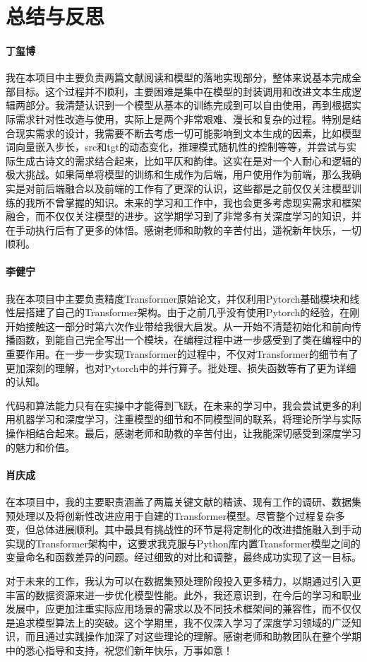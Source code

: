 \section{总结与反思}\label{sec-8}

\paragraph{丁玺博} 我在本项目中主要负责两篇文献阅读和模型的落地实现部分，整体来说基本完成全部目标。这个过程并不顺利，主要困难是集中在模型的封装调用和改进文本生成逻辑两部分。我清楚认识到一个模型从基本的训练完成到可以自由使用，再到根据实际需求针对性改造与使用，实际上是两个非常艰难、漫长和复杂的过程。特别是结合现实需求的设计，我需要不断去考虑一切可能影响到文本生成的因素，比如模型词向量嵌入步长，src和tgt的动态变化，推理模式随机性的控制等等，并尝试与实际生成古诗文的需求结合起来，比如平仄和韵律。这实在是对一个人耐心和逻辑的极大挑战。如果简单将模型的训练和生成作为后端，用户使用作为前端，那么我确实是对前后端融合以及前端的工作有了更深的认识，这些都是之前仅仅关注模型训练的我所不曾掌握的知识。未来的学习和工作中，我也会更多考虑现实需求和框架融合，而不仅仅关注模型的进步。这学期学习到了非常多有关深度学习的知识，并在手动执行后有了更多的体悟。感谢老师和助教的辛苦付出，遥祝新年快乐，一切顺利。

\paragraph{李健宁} 我在本项目中主要负责精度Transformer原始论文，并仅利用Pytorch基础模块和线性层搭建了自己的Transformer架构。由于之前几乎没有使用Pytorch的经验，在刚开始接触这一部分时第六次作业带给我很大启发。从一开始不清楚初始化和前向传播函数，到能自己完全写出一个模块，在编程过程中进一步感受到了类在编程中的重要作用。在一步一步实现Transformer的过程中，不仅对Transformer的细节有了更加深刻的理解，也对Pytorch中的并行算子。批处理、损失函数等有了更为详细的认知。

代码和算法能力只有在实操中才能得到飞跃，在未来的学习中，我会尝试更多的利用机器学习和深度学习，注重模型的细节和不同模型间的联系，将理论所学与实际操作相结合起来。最后，感谢老师和助教的辛苦付出，让我能深切感受到深度学习的魅力和价值。

\paragraph{肖庆成} 在本项目中，我的主要职责涵盖了两篇关键文献的精读、现有工作的调研、数据集预处理以及将创新性改进应用于自建的Transformer模型。尽管整个过程复杂多变，但总体进展顺利。其中最具有挑战性的环节是将定制化的改进措施融入到手动实现的Transformer架构中，这要求我克服与Python库内置Transformer模型之间的变量命名和函数差异的问题。经过细致的对比和调整，最终成功实现了这一目标。

对于未来的工作，我认为可以在数据集预处理阶段投入更多精力，以期通过引入更丰富的数据资源来进一步优化模型性能。此外，我还意识到，在今后的学习和职业发展中，应更加注重实际应用场景的需求以及不同技术框架间的兼容性，而不仅仅是追求模型算法上的突破。这个学期里，我不仅深入学习了深度学习领域的广泛知识，而且通过实践操作加深了对这些理论的理解。感谢老师和助教团队在整个学期中的悉心指导和支持，祝您们新年快乐，万事如意！

